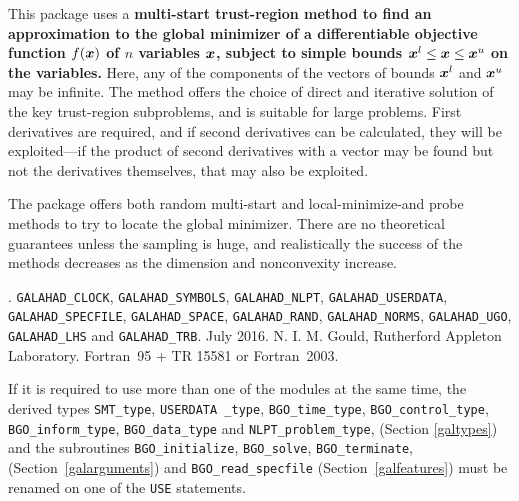 \documentclass{galahad}
\newcommand{\packagename}{BGO}
\newcommand{\fullpackagename}{\libraryname\_\packagename}
\begin{document}
\galheader


\galsummary
This package uses a {\bf multi-start trust-region method to find an 
approximation to the global minimizer of a differentiable objective 
function $f({\bm{x}})$ of $n$ variables ${\bm{x}}$, subject to simple bounds 
${\bm{x}}^l \leq {\bm{x}} \leq {\bm{x}}^u$ on the variables.}
Here, any of the components of the vectors of bounds ${\bm{x}}^l$ and ${\bm{x}}^u$ 
may be infinite. The method offers the choice of direct
and iterative solution of the key trust-region subproblems, and
is suitable for large problems. First derivatives are required,
and if second derivatives can be calculated, they will be exploited---if
the product of second derivatives with a vector may be found but
not the derivatives themselves, that may also be exploited.

The package offers both random multi-start and local-minimize-and probe 
methods to try to locate the global minimizer. There are no theoretical 
guarantees unless the sampling is huge, and realistically the success of 
the methods decreases as the dimension and nonconvexity increase.


\galattributes
\galversions{\tt  \fullpackagename\_single, \fullpackagename\_double}.
\galuses
{\tt GALAHAD\_CLOCK},
{\tt GALAHAD\_SY\-M\-BOLS},
{\tt GALAHAD\_NLPT},
{\tt GALAHAD\_USERDATA},
{\tt GALAHAD\_SPECFILE},
{\tt GALAHAD\_SPACE},
{\tt GALAHAD\_RAND},
{\tt GALAHAD\_\-NORMS},
{\tt GALAHAD\_UGO},
{\tt GALAHAD\_LHS}
and 
{\tt GALAHAD\_TRB}.
\galdate July 2016.
\galorigin N. I. M. Gould, Rutherford Appleton Laboratory.
\gallanguage Fortran~95 + TR 15581 or Fortran~2003.


\galhowto




\noindent
If it is required to use more than one of the modules at the same time, 
the derived types
{\tt SMT\_type},
{\tt USERDATA\ \_type},
{\tt \packagename\_time\_\-type},
{\tt \packagename\_control\_type},
{\tt \packagename\_inform\_type},
{\tt \packagename\_data\_type}
and
{\tt NLPT\_problem\_type},
(Section \ref{galtypes})
and the subroutines
{\tt \packagename\_initialize},
{\tt \packagename\_\-solve},
{\tt \packagename\_terminate},
(Section~\ref{galarguments})
and
{\tt \packagename\_read\_specfile}
(Section~\ref{galfeatures})
must be renamed on one of the {\tt USE} statements.
\end{document}
